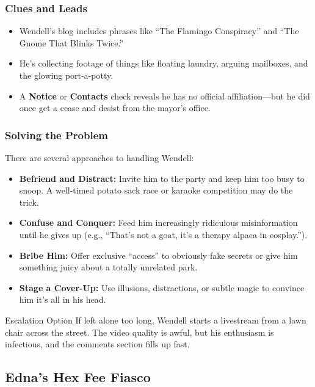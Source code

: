 \subsubsection{Clues and Leads}
\begin{itemize}\raggedright
    \item Wendell’s blog includes phrases like “The Flamingo Conspiracy” and “The Gnome That Blinks Twice.”
    \item He’s collecting footage of things like floating laundry, arguing mailboxes, and the glowing port-a-potty.
    \item A \textbf{Notice}  or \textbf{Contacts}  check reveals he has no official affiliation—but he did once get a cease and desist from the mayor’s office.
\end{itemize}

\subsubsection{Solving the Problem}
There are several approaches to handling Wendell:
\begin{itemize}
    \item \textbf{Befriend and Distract:} Invite him to the party and keep him too busy to snoop. A well-timed potato sack race or karaoke competition may do the trick.
    \item \textbf{Confuse and Conquer:} Feed him increasingly ridiculous misinformation until he gives up (e.g., “That’s not a goat, it’s a therapy alpaca in cosplay.”).
    \item \textbf{Bribe Him:} Offer exclusive “access” to obviously fake secrets or give him something juicy about a totally unrelated park.
    \item \textbf{Stage a Cover-Up:} Use illusions, distractions, or subtle magic to convince him it’s all in his head.
\end{itemize}

\begin{CommentBox}{Escalation Option}
    If left alone too long, Wendell starts a livestream from a lawn chair across the street. The video quality is awful, but his enthusiasm is infectious, and the comments section fills up fast.
\end{CommentBox}








\subsection{Edna's Hex Fee Fiasco}

